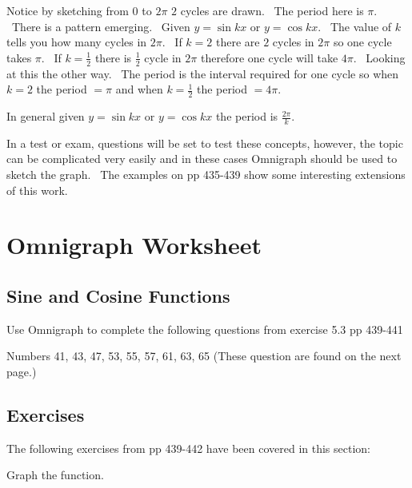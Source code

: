   
\setlength\fboxrule{0.01in}\setlength\fboxsep{0.2in}


Notice by sketching from $0$ to $2 \pi $ $2$ cycles are drawn. \ The period here is $\pi $. \ There is a pattern emerging. \ Given
$y =\sin  k x$ or $y =\cos  k x$. \ The value of $k$ tells you how many cycles in $2 \pi $. \ If $k =2$ there are $2$ cycles in $2 \pi $ so one cycle takes $\pi $. \ If $k =\frac{1}{2}$ there is $\frac{1}{2}$ cycle in $2 \pi $ therefore one cycle will take $4 \pi $. \ Looking at this the other way. \ The
period is the interval required for one cycle so when $k =2$ the period $ =\pi $ and when $k =\frac{1}{2}$ the period $ =4 \pi \text{.}$ 

In general given $y =\sin  k x$ or $y =\cos  k x$ the period is $\frac{2 \pi }{k}$. 

In a test or exam, questions will be set to test these concepts, however, the topic can be complicated very
easily and in these cases Omnigraph should be used to sketch the graph. \ The examples on pp 435-439 show some
interesting extensions of this work. 

\section{Omnigraph Worksheet}


\subsection{Sine and Cosine Functions}
Use Omnigraph to complete the following questions from exercise 5.3 pp 439-441 

Numbers 41, 43, 47, 53, 55, 57, 61, 63,
65 (These question are found on the next page.) 

\subsection{Exercises}
The following exercises from pp 439-442 have been covered in this section: 

Graph the function. 


